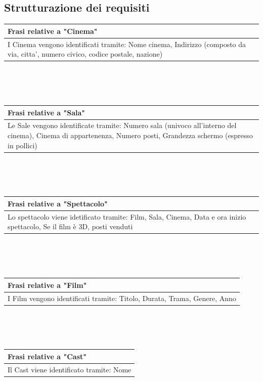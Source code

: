 \documentclass[10pt]{article}
\begin{document}
 	\subsection{Strutturazione dei requisiti}
	\begin{tabular} { |p{16.8cm}| }
 		\hline
 		\rowcolor{lightgray}
 		\textbf{Frasi relative a "Cinema"} \\
 		\hline
 		I Cinema vengono identificati tramite: Nome cinema, Indirizzo (composto da via, citta', numero civico, codice postale, nazione) \\
 		\hline 		
 	\end{tabular}
 	\\\\\\
	\begin{tabular} { |p{16.8cm}| }
	 	\hline
	 	\rowcolor{lightgray}
	 	\textbf{Frasi relative a "Sala"} \\
	 	\hline
	 	Le Sale vengono identificate tramite: Numero sala (univoco all'interno del cinema), Cinema di appartenenza, Numero posti, Grandezza schermo (espresso in pollici) \\
	 	\hline 		
	\end{tabular} 
	\\\\\\
	\begin{tabular} { |p{16.8cm}| }
		\hline
		\rowcolor{lightgray}
		\textbf{Frasi relative a "Spettacolo"} \\
		\hline
		Lo spettacolo viene idetificato tramite: Film, Sala, Cinema, Data e ora inizio spettacolo, Se il film è 3D, posti venduti \\
		\hline 		
	\end{tabular} 
	\\\\\\
	\begin{tabular} { |p{16.8cm}| }
		\hline
		\rowcolor{lightgray}
		\textbf{Frasi relative a "Film"} \\
		\hline
		I Film vengono identificati tramite: Titolo, Durata, Trama, Genere, Anno \\
		\hline 		
	\end{tabular} 
 	\\\\\\
 	\begin{tabular} { |p{16.8cm}| }
 		\hline
 		\rowcolor{lightgray}
 		\textbf{Frasi relative a "Cast"} \\
 		\hline
 		Il Cast viene identificato tramite: Nome \\
 		\hline 		
 	\end{tabular} 
\end{document}
